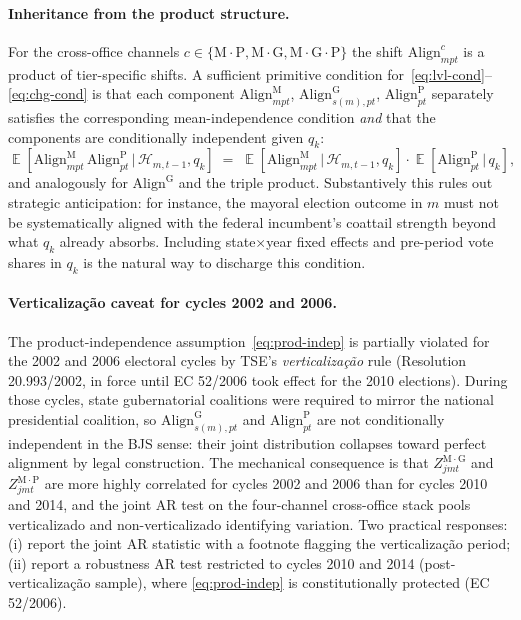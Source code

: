 \documentclass{article}
\newcommand{\Align}{\mathrm{Align}}
\DeclareMathOperator{\E}{\mathbb{E}}
\theoremstyle{plain}
\theoremstyle{definition}
\theoremstyle{remark}
\begin{document}
\paragraph{Inheritance from the product structure.}
For the cross-office channels $c\in\{\mathrm{M{\cdot}P},
\mathrm{M{\cdot}G},\mathrm{M{\cdot}G{\cdot}P}\}$ the shift
$\Align^{c}_{mpt}$ is a product of tier-specific shifts. A sufficient
primitive condition for~\eqref{eq:lvl-cond}--\eqref{eq:chg-cond} is that
each component $\Align^{\mathrm{M}}_{mpt}$, $\Align^{\mathrm{G}}_{s(m),pt}$,
$\Align^{\mathrm{P}}_{pt}$ separately satisfies the corresponding
mean-independence condition \emph{and} that the components are
conditionally independent given $q_k$:
\begin{equation}\label{eq:prod-indep}
  \E\!\left[\Align^{\mathrm{M}}_{mpt}\,\Align^{\mathrm{P}}_{pt}\,\big|\,
    \mathcal{H}_{m,t-1},q_k\right]
  \;=\;
  \E\!\left[\Align^{\mathrm{M}}_{mpt}\,\big|\,
    \mathcal{H}_{m,t-1},q_k\right]\cdot
  \E\!\left[\Align^{\mathrm{P}}_{pt}\,\big|\,q_k\right],
\end{equation}
and analogously for $\Align^{\mathrm{G}}$ and the triple product.
Substantively this rules out strategic anticipation: for instance, the
mayoral election outcome in $m$ must not be systematically aligned with
the federal incumbent's coattail strength beyond what $q_k$ already
absorbs. Including state$\times$year fixed effects and pre-period vote
shares in $q_k$ is the natural way to discharge this condition.

\paragraph{Verticalização caveat for cycles 2002 and 2006.}
The product-independence assumption~\eqref{eq:prod-indep} is partially
violated for the 2002 and 2006 electoral cycles by TSE's
\emph{verticalização} rule (Resolution 20.993/2002, in force until EC
52/2006 took effect for the 2010 elections). During those cycles, state
gubernatorial coalitions were required to mirror the national presidential
coalition, so $\Align^{\mathrm{G}}_{s(m),pt}$ and $\Align^{\mathrm{P}}_{pt}$
are not conditionally independent in the BJS sense: their joint distribution
collapses toward perfect alignment by legal construction. The mechanical
consequence is that $Z^{\mathrm{M{\cdot}G}}_{jmt}$ and $Z^{\mathrm{M{\cdot}P}}_{jmt}$
are more highly correlated for cycles 2002 and 2006 than for cycles 2010
and 2014, and the joint AR test on the four-channel cross-office stack pools
verticalizado and non-verticalizado identifying variation. Two practical
responses: (i) report the joint AR statistic with a footnote flagging
the verticalização period; (ii) report a robustness AR test restricted
to cycles 2010 and 2014 (post-verticalização sample), where
\eqref{eq:prod-indep} is constitutionally protected (EC 52/2006).
\end{document}
